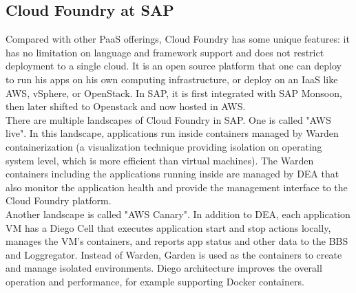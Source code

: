 \subsection{Cloud Foundry at SAP}
\label{cloud-foundry}
Compared with other PaaS offerings, Cloud Foundry has some unique features: it has no limitation on language and framework support and does not restrict deployment to a single cloud. It is an open source platform that one can deploy to run his apps on his own computing infrastructure, or deploy on an IaaS like \ac{AWS}, vSphere, or OpenStack. In SAP, it is first integrated with SAP Monsoon, then later shifted to Openstack and now hosted in \ac{AWS}. \\
There are multiple landscapes of Cloud Foundry in SAP. One is called "AWS live". In this landscape, applications run inside containers managed by Warden   \citep{Warden} containerization (a visualization technique providing isolation on operating system level, which is more efficient than virtual machines). The Warden containers including the applications running inside are managed by \ac{DEA} that also monitor the application health and provide the management interface to the Cloud Foundry platform.\\
Another landscape is called "AWS Canary". In addition to \ac{DEA}, each application VM has a Diego Cell \citep{Diego} that executes application start and stop actions locally, manages the VM’s containers, and reports app status and other data to the \ac{BBS} \citep{BBS} and Loggregator. Instead of Warden, Garden \citep{Garden} is used as the containers to create and manage isolated environments. Diego architecture improves the overall operation and performance, for example supporting Docker containers.


